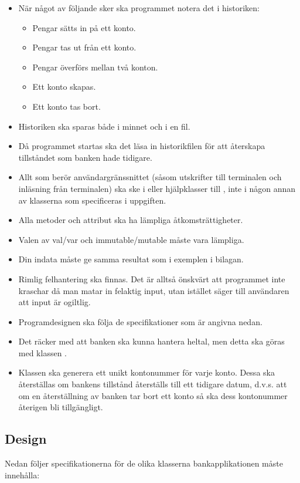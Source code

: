 \begin{itemize}
\item När något av följande sker ska programmet notera det i historiken:
\begin{itemize}
\item Pengar sätts in på ett konto.
\item Pengar tas ut från ett konto.
\item Pengar överförs mellan två konton.
\item Ett konto skapas.
\item Ett konto tas bort.
\end{itemize}
\item Historiken ska sparas både i minnet och i en fil.
\item Då programmet startas ska det läsa in historikfilen för att återskapa tillståndet som banken hade tidigare.
\item Allt som berör användargränssnittet (såsom utskrifter till terminalen och inläsning från terminalen) ska ske i  eller hjälpklasser till , inte i någon annan av klasserna som specificeras i uppgiften.
\item Alla metoder och attribut ska ha lämpliga åtkomsträttigheter.
\item Valen av val/var och immutable/mutable måste vara lämpliga.
\item Din indata måste ge samma resultat som i exemplen i bilagan.
\item Rimlig felhantering ska finnas. Det är alltså önskvärt att programmet inte kraschar då man matar in felaktig input, utan istället säger till användaren att input är ogiltlig.
\item Programdesignen ska följa de specifikationer som är angivna nedan.
\item Det räcker med att banken ska kunna hantera heltal, men detta ska göras med klassen .
\item Klassen  ska generera ett unikt kontonummer för varje konto. Dessa ska återställas om bankens tillstånd återställs till ett tidigare datum, d.v.s. att om en återställning av banken tar bort ett konto så ska dess kontonummer återigen bli tillgängligt.
\end{itemize}

\subsection{Design}
Nedan följer specifikationerna för de olika klasserna bankapplikationen måste innehålla:

